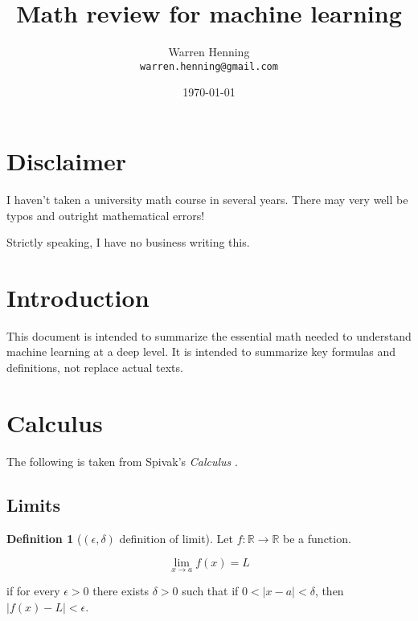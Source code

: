 \documentclass{article}
\begin{document}
\title{Math review for machine learning}
\author{Warren Henning\\\texttt{warren.henning@gmail.com}}
\date{\today}

\maketitle

\section{Disclaimer}

I haven't taken a university math course in several years. There may very well
be typos and outright mathematical errors!

Strictly speaking, I have no business writing this.

\section{Introduction}

This document is intended to summarize the essential math needed to understand
machine learning at a deep level. It is intended to summarize key formulas and
definitions, not replace actual texts.

\section{Calculus}

The following is taken from Spivak's {\it Calculus} \cite{spivak}.

\subsection{Limits}

\theoremstyle{definition}
\newtheorem{definition}{Definition}
\newtheorem{example}{Example}
\newtheorem{theorem}{Theorem}

\begin{definition}[$(\epsilon, \delta)$ definition of limit]

Let $f: \mathbb{R} \to \mathbb{R}$ be a function. 

\begin{equation}
\lim_{x \to a} f(x) = L
\end{equation}

if for every $\epsilon > 0$ there exists $\delta > 0$ such that if $0 < |x-a| <
\delta$, then $|f(x) - L| < \epsilon$.
 
\end{definition}
\end{document}
